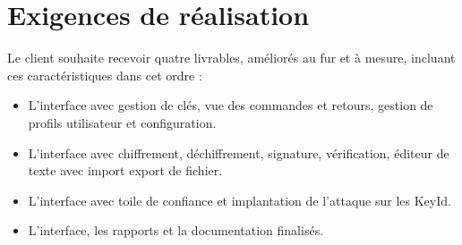 \documentclass{../res/univ-projet}
\begin{document}
\section{Exigences de réalisation}

Le client souhaite recevoir quatre livrables, améliorés au fur et à mesure, incluant ces caractéristiques dans cet ordre :
\begin{itemize}
 \item L'interface avec gestion de clés, vue des commandes et retours, gestion de profils utilisateur et configuration.
 \item L'interface avec chiffrement, déchiffrement, signature, vérification, éditeur de texte avec import export de fichier.
 \item L'interface avec toile de confiance et implantation de l'attaque sur les KeyId.
 \item L'interface, les rapports et la documentation finalisés.
\end{itemize}


\end{document}
